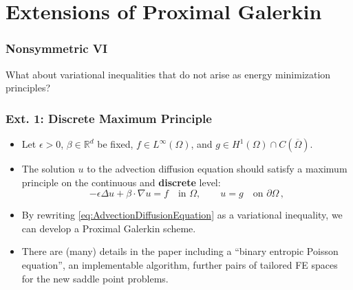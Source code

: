 \documentclass[aspectratio=169,xcolor=dvipsnames,11pt]{beamer}
\begin{document}
\section{Extensions of Proximal Galerkin}
\begin{frame}\frametitle{Nonsymmetric VI}
{\Large
{\color{Maroon}
What about variational inequalities that do not arise as energy minimization principles?
}
}
\end{frame}

\begin{frame}\frametitle{Ext. 1: Discrete Maximum Principle}
\begin{itemize}
\item
Let $\epsilon > 0$, $\beta \in \mathbb{R}^d$ be fixed, $f \in L^\infty(\Omega)$, and $g \in H^1(\Omega) \cap C(\overline{\Omega})$. 
\item The solution $u$ to the advection diffusion equation should satisfy a maximum principle on the continuous and \textbf{discrete} level:
\begin{equation}
\label{eq:AdvectionDiffusionEquation}
	-\epsilon\Delta u + \beta\cdot\nabla u = f
	\quad \text{in~} \Omega,
	\qquad
	u = g \quad \text{on~} \partial\Omega
	\,,
\end{equation}
\item By rewriting \eqref{eq:AdvectionDiffusionEquation} as a variational inequality, we can develop a Proximal Galerkin scheme.
\item There are (many) details in the paper including a ``binary entropic Poisson equation'', an implementable algorithm, further pairs of tailored FE spaces for the new saddle point problems.
\end{itemize}
\end{frame}
\end{document}
